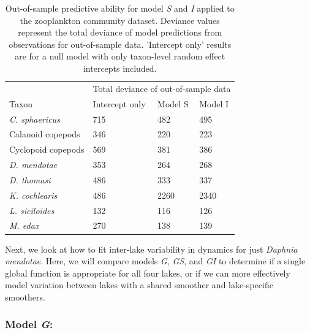 \documentclass[12pt]{article}
\begin{document}
\begin{table}[t]

\caption{\label{tab:zoo_comm_outofsample_kable}Out-of-sample predictive ability for model \textit{S} and \textit{I} applied to the zooplankton community dataset. Deviance values represent the total deviance of model predictions from observations for out-of-sample data. 'Intercept only' results are for a null model with only taxon-level random effect intercepts included.}
\centering
\begin{tabular}{llll}
\toprule
\multicolumn{1}{c}{ } & \multicolumn{3}{c}{Total deviance of out-of-sample data} \\
\cmidrule(l{2pt}r{2pt}){2-4}
Taxon & Intercept only & Model S & Model I\\
\midrule
\em{C. sphaericus} & 715 & 482 & 495\\
Calanoid copepods & 346 & 220 & 223\\
Cyclopoid copepods & 569 & 381 & 386\\
\em{D. mendotae} & 353 & 264 & 268\\
\em{D. thomasi} & 486 & 333 & 337\\
\addlinespace
\em{K. cochlearis} & 486 & 2260 & 2340\\
\em{L. siciloides} & 132 & 116 & 126\\
\em{M. edax} & 270 & 138 & 139\\
\bottomrule
\end{tabular}
\end{table}

Next, we look at how to fit inter-lake variability in dynamics for just
\emph{Daphnia mendotae}. Here, we will compare models \emph{G},
\emph{GS}, and \emph{GI} to determine if a single global function is
appropriate for all four lakes, or if we can more effectively model
variation between lakes with a shared smoother and lake-specific
smoothers.

\subsubsection{\texorpdfstring{Model
\emph{G}:}{Model G:}}\label{model-g}
\end{document}
